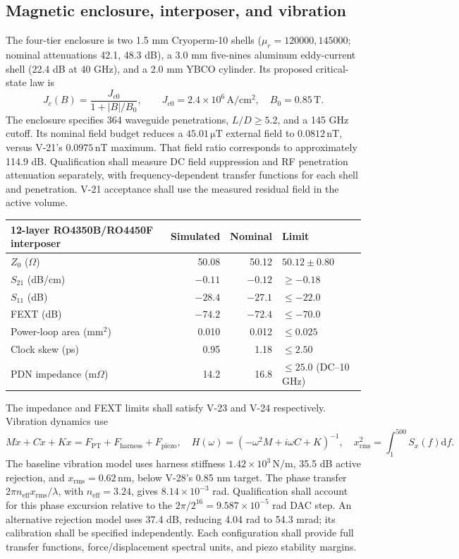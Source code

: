 \documentclass[11pt,a4paper]{article}
\newcommand{\dd}{\mathrm d}
\newcommand{\unit}[1]{\,\mathrm{#1}}
\begin{document}
\subsection{Magnetic enclosure, interposer, and vibration}
The four-tier enclosure is two 1.5 mm Cryoperm-10 shells
($\mu_r=120000,145000$; nominal attenuations 42.1, 48.3 dB), a 3.0 mm five-nines aluminum
eddy-current shell (22.4 dB at 40 GHz), and a 2.0 mm YBCO cylinder.
Its proposed critical-state law is
\[
 J_c(B)=\frac{J_{c0}}{1+|B|/B_0},\qquad
 J_{c0}=2.4\times10^6\unit{A/cm^2},\quad B_0=0.85\unit T.
\]
The enclosure specifies 364 waveguide penetrations, $L/D\ge5.2$, and a 145 GHz cutoff.
Its nominal field budget reduces a $45.01\unit{\mu T}$ external field to $0.0812\unit{nT}$, versus
V-21's $0.0975\unit{nT}$ maximum. That field ratio corresponds to approximately
114.9 dB. Qualification shall measure DC field suppression and RF penetration
attenuation separately, with frequency-dependent transfer functions for each shell
and penetration. V-21 acceptance shall use the measured residual field in the active volume.

\begin{center}\small
\begin{tabular}{@{}lrrl@{}}\toprule
12-layer RO4350B/RO4450F interposer & Simulated & Nominal & Limit\\\midrule
$Z_0$ ($\Omega$) & 50.08 & 50.12 & $50.12\pm0.80$\\
$S_{21}$ (dB/cm) & $-0.11$ & $-0.12$ & $\ge-0.18$\\
$S_{11}$ (dB) & $-28.4$ & $-27.1$ & $\le-22.0$\\
FEXT (dB) & $-74.2$ & $-72.4$ & $\le-70.0$\\
Power-loop area (mm$^2$) & 0.010 & 0.012 & $\le0.025$\\
Clock skew (ps) & 0.95 & 1.18 & $\le2.50$\\
PDN impedance (m$\Omega$) & 14.2 & 16.8 & $\le25.0$ (DC--10 GHz)\\\bottomrule
\end{tabular}\end{center}
The impedance and FEXT limits shall satisfy V-23 and V-24 respectively.
Vibration dynamics use
\[
 M\ddot x+C\dot x+Kx=F_{\mathrm{PT}}+F_{\mathrm{harness}}+F_{\mathrm{piezo}},
 \quad H(\omega)=(-\omega^2M+i\omega C+K)^{-1},
 \quad x_{\mathrm{rms}}^2=\int_1^{500}S_x(f)\dd f.
\]
The baseline vibration model uses harness stiffness $1.42\times10^3\unit{N/m}$, 35.5 dB active rejection,
and $x_{\mathrm{rms}}=0.62\unit{nm}$, below V-28's 0.85 nm target. The phase transfer
$2\pi n_{\mathrm{eff}}x_{\mathrm{rms}}/\lambda$, with $n_{\mathrm{eff}}=3.24$,
gives $8.14\times10^{-3}$ rad. Qualification shall account for this phase excursion
relative to the $2\pi/2^{16}=9.587\times10^{-5}$ rad DAC step.
An alternative rejection model uses 37.4 dB, reducing 4.04 rad to 54.3 mrad;
its calibration shall be specified independently. Each configuration shall provide
full transfer functions, force/displacement spectral units, and piezo stability margins.
\end{document}

